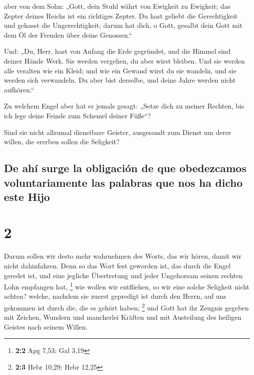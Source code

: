  aber von dem Sohn: „Gott, dein Stuhl währt von Ewigkeit
zu Ewigkeit; das Zepter deines Reichs ist ein richtiges Zepter.
 Du hast geliebt die Gerechtigkeit und gehasst die
Ungerechtigkeit; darum hat dich, o Gott, gesalbt dein Gott mit dem Öl
der Freuden über deine Genossen.``

 Und: „Du, Herr, hast von Anfang die Erde gegründet, und
die Himmel sind deiner Hände Werk.  Sie werden vergehen,
du aber wirst bleiben. Und sie werden alle veralten wie ein Kleid;
 und wie ein Gewand wirst du sie wandeln, und sie werden
sich verwandeln. Du aber bist derselbe, und deine Jahre werden nicht
aufhören.``

 Zu welchem Engel aber hat er jemals gesagt: „Setze dich
zu meiner Rechten, bis ich lege deine Feinde zum Schemel deiner Füße``?

 Sind sie nicht allzumal dienstbare Geister, ausgesandt
zum Dienst um derer willen, die ererben sollen die Seligkeit?

\hypertarget{de-ahuxed-surge-la-obligaciuxf3n-de-que-obedezcamos-voluntariamente-las-palabras-que-nos-ha-dicho-este-hijo}{%
\subsection{De ahí surge la obligación de que obedezcamos
voluntariamente las palabras que nos ha dicho este
Hijo}\label{de-ahuxed-surge-la-obligaciuxf3n-de-que-obedezcamos-voluntariamente-las-palabras-que-nos-ha-dicho-este-hijo}}

\hypertarget{section-1}{%
\section{2}\label{section-1}}

 Darum sollen wir desto mehr wahrnehmen des Worts, das wir
hören, damit wir nicht dahinfahren.  Denn so das Wort fest
geworden ist, das durch die Engel geredet ist, und eine jegliche
Übertretung und jeder Ungehorsam seinen rechten Lohn empfangen hat,
\footnote{\textbf{2:2} Apg 7,53; Gal 3,19}  wie wollen wir
entfliehen, so wir eine solche Seligkeit nicht achten? welche, nachdem
sie zuerst gepredigt ist durch den Herrn, auf uns gekommen ist durch
die, die es gehört haben; \footnote{\textbf{2:3} Hebr 10,29; Hebr 12,25}
 und Gott hat ihr Zeugnis gegeben mit Zeichen, Wundern und
mancherlei Kräften und mit Austeilung des heiligen Geistes nach seinem
Willen.

